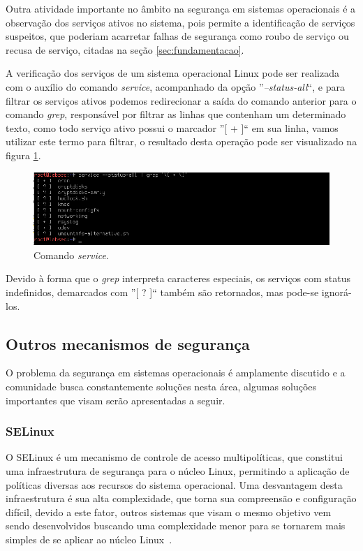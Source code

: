 \documentclass[
  12pt,				%
  oneside,   	        %
  a4paper,			%
  english,			%
  french,				%
  spanish,			%
  brazil,				%
  ]{pacotes/abntex2}
\begin{document}
Outra atividade importante no âmbito na segurança em sistemas operacionais é a observação dos serviços ativos no sistema, pois permite a identificação de serviços suspeitos, que poderiam acarretar falhas de segurança como roubo de serviço ou recusa de serviço, citadas na seção \ref{sec:fundamentacao}.

A verificação dos serviços de um sistema operacional Linux pode ser realizada com o auxílio do comando \textit{service}, acompanhado da opção ''\textit{--status-all}``, e para filtrar os serviços ativos podemos redirecionar a saída do comando anterior para o comando \textit{grep}, responsável por filtrar as linhas que contenham um determinado texto, como todo serviço ativo possui o marcador ''[ + ]`` em sua linha, vamos utilizar este termo para filtrar, o resultado desta operação pode ser visualizado na figura \ref{fig:service}.

\begin{figure}[H]
  \centering
  \includegraphics[scale=0.7]{figuras/service.png}
  \caption{Comando \textit{service}.}
  \label{fig:service}
\end{figure}

Devido à forma que o \textit{grep} interpreta caracteres especiais, os serviços com status indefinidos, demarcados com ''[ ? ]`` também são retornados, mas pode-se ignorá-los.

\subsection{Outros mecanismos de segurança}
O problema da segurança em sistemas operacionais é amplamente discutido e a comunidade busca constantemente soluções nesta área, algumas soluções importantes que visam serão apresentadas a seguir.

\subsubsection{SELinux}
O SELinux é um mecanismo de controle de acesso multipolíticas, que constitui uma infraestrutura de segurança para o núcleo Linux, permitindo a aplicação de políticas diversas aos recursos do sistema operacional. Uma desvantagem desta infraestrutura é sua alta complexidade, que torna sua compreensão e configuração difícil, devido a este fator, outros sistemas que visam o mesmo objetivo vem sendo desenvolvidos buscando uma complexidade menor para se tornarem mais simples de se aplicar ao núcleo Linux~\cite{maziero2019}.
\end{document}
